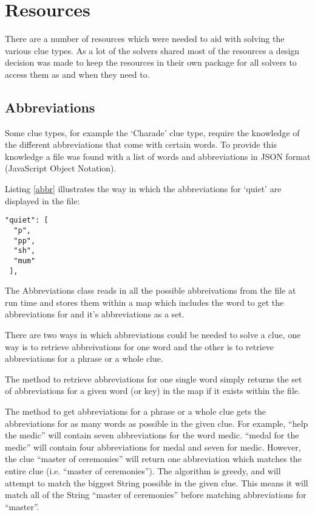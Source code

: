 \section{Resources}
\label{sec:resources}

There are a number of resources which were needed to aid with solving 
the various clue types. As a lot of the solvers shared most of the resources 
a design decision was made to keep the resources in their own package for 
all solvers to access them as and when they need to.


\subsection{Abbreviations}

Some clue types, for example the `Charade' clue type, require the knowledge 
of the different abbreviations that come with certain words. To provide this 
knowledge a file was found with a list of words and abbreviations in JSON 
format (JavaScript Object Notation). 

Listing \ref{abbr} illustrates the way in which the abbreviations for `quiet' 
are displayed in the file:

\begin{lstlisting}[caption={A sample of the abbreviations file},
                   label=abbr]  
 "quiet": [
  "p", 
  "pp", 
  "sh", 
  "mum"
 ], 
\end{lstlisting}

The Abbreviations class reads in all the possible abbreivations from the file 
at run time and stores them within a map which includes the word to get the 
abbreviations for and it's abbreviations as a set. 

There are two ways in which abbreviations could be needed to solve a clue, 
one way is to retrieve abbreivations for one word and the other is to 
retrieve abbreviations for a phrase or a whole clue. 

The method to retrieve abbreviations for one single word simply returns the 
set of abbreviations for a given word (or key) in the map if it exists within the 
file. 

The method to get abbreviations for a phrase or a whole clue gets the
abbreviations for as many words as possible in the given clue. For example,
``help the medic'' will contain seven abbreviations for the word  medic. ``medal
for the medic'' will contain four abbreviations for medal and seven  for medic.
However, the clue ``master of ceremonies'' will return one  abbreviation which
matches the entire clue (i.e. ``master of ceremonies'').  The algorithm is
greedy, and will attempt to match the biggest String possible in the given clue.
This means it will match all of the String  ``master of ceremonies'' before
matching abbreviations for ``master''.


